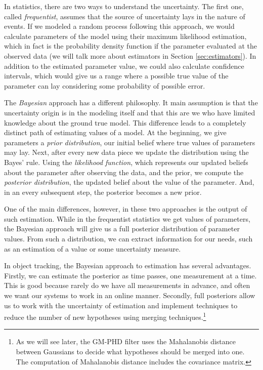 
In statistics, there are two ways to understand the uncertainty. The first one,
called \textit{frequentist}, assumes that the source of uncertainty lays in the
nature of events. If we modeled a random process following this approach, we 
would calculate parameters of the model using their maximum likelihood 
estimation, which in fact is the probability density function if the parameter 
evaluated at the observed data (we will talk more about estimators in Section 
\ref{sec:estimators}). In addition to the estimated parameter 
value, we could also calculate confidence intervals, which would give us a 
range where a possible true value of the parameter can lay considering some 
probability of possible error.

The \textit{Bayesian} approach has a different philosophy. It main
assumption is that the uncertainty origin is in the modeling itself and that
this are we who have limited knowledge about the ground true model. This
difference leads to a completely distinct path of estimating values of a model.
At the beginning, we give parameters a \textit{prior distribution}, our
initial belief where true values of parameters may lay. Next, after every new
data piece we update the distribution using the Bayes' rule. Using the
\textit{likelihood function}, which represents our updated beliefs about the
parameter after observing the data, and the prior, we compute the
\textit{posterior distribution}, the updated belief about the value of the
parameter. And, in an every subsequent step, the posterior becomes a new prior.

One of the main differences, however, in these two approaches is the output of 
such estimation. While in the frequentist statistics we get values of 
parameters, the Bayesian approach will give us a full posterior distribution of 
parameter values. From such a distribution, we can extract information for our 
needs, such as an estimation of a value or some uncertainty measure.

In object tracking, the Bayesian approach to estimation has several advantages. 
Firstly, we can estimate the posterior as time passes, one measurement at a 
time. This is good because rarely do we have all measurements in advance, and 
often we want our systems to work in an online manner. Secondly, full 
posteriors allow us to work with the uncertainty of estimation and implement 
techniques to reduce the number of new hypotheses using merging 
techniques.\footnote{
    As we will see later, the GM-PHD filter uses the Mahalanobis distance 
    between Gaussians to decide what hypotheses should be merged into one. The 
    computation of Mahalanobis distance includes the covariance matrix.
}

